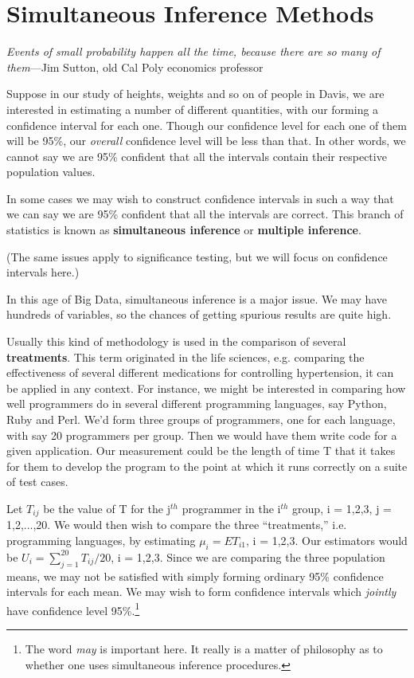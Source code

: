 \chapter{Simultaneous Inference Methods} 
\label{chap:simultaninfer} 

{\it Events of small probability happen all the time, because there are
so many of them}---Jim Sutton, old Cal Poly economics professor

Suppose in our study of heights, weights and so on of people in Davis,
we are interested in estimating a number of different quantities, with
our forming a confidence interval for each one.  Though our confidence
level for each one of them will be 95\%, our {\it overall} confidence
level will be less than that.  In other words, we cannot say we are 95\%
confident that all the intervals contain their respective population
values.

In some cases we may wish to construct confidence intervals in such a
way that we can say we are 95\% confident that all the intervals are
correct.  This branch of statistics is known as {\bf simultaneous
inference} or {\bf multiple inference}.  

(The same issues apply to significance testing, but we will focus on
confidence intervals here.)

In this age of Big Data, simultaneous inference is a major issue.  We
may have hundreds of variables, so the chances of getting spurious
results are quite high.

Usually this kind of methodology is used in the comparison of several
{\bf treatments}.  This term originated in the life sciences, e.g.
comparing the effectiveness of several different medications for
controlling hypertension, it can be applied in any context.  For
instance, we might be interested in comparing how well programmers do in
several different programming languages, say Python, Ruby and Perl.
We'd form three groups of programmers, one for each language, with say
20 programmers per group.  Then we would have them write code for a
given application.  Our measurement could be the length of time T that
it takes for them to develop the program to the point at which it runs
correctly on a suite of test cases.  

Let $T_{ij}$ be the value of T for the j$^{th}$ programmer in the
i$^{th}$ group, i = 1,2,3, j = 1,2,...,20.  We would then wish to
compare the three ``treatments,'' i.e. programming languages, by
estimating $\mu_i = ET_{i1}$, i = 1,2,3.  Our estimators would be $U_i =
\sum_{j=1}^{20} T_{ij}/20$, i = 1,2,3.  Since we are comparing the three
population means, we may not be satisfied with simply forming ordinary
95\% confidence intervals for each mean.  We may wish to form confidence
intervals which {\it jointly} have confidence level 95\%.\footnote{The
word {\it may} is important here.  It really is a matter of philosophy
as to whether one uses simultaneous inference procedures.}

